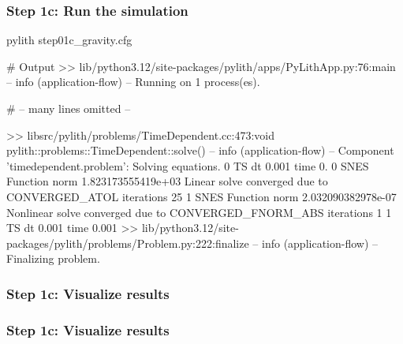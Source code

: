 \documentclass[aspectratio=169]{beamer}
\begin{document}
\begin{frame}[fragile]
  \frametitle{Step 1c: Run the simulation}
  \summary{}

\begin{pyrejournal}
pylith step01c_gravity.cfg

# Output
 >> lib/python3.12/site-packages/pylith/apps/PyLithApp.py:76:main
 -- info (application-flow)
 -- Running on 1 process(es).

# -- many lines omitted --

 >> libsrc/pylith/problems/TimeDependent.cc:473:void pylith::problems::TimeDependent::solve()
 -- info (application-flow)
 -- Component 'timedependent.problem': Solving equations.
0 TS dt 0.001 time 0.
    0 SNES Function norm 1.823173555419e+03
      Linear solve converged due to CONVERGED_ATOL iterations 25
    1 SNES Function norm 2.032090382978e-07
    Nonlinear solve converged due to CONVERGED_FNORM_ABS iterations 1
1 TS dt 0.001 time 0.001
 >> lib/python3.12/site-packages/pylith/problems/Problem.py:222:finalize
 -- info (application-flow)
 -- Finalizing problem.
\end{pyrejournal}
  
\end{frame}



\begin{frame}
  \frametitle{Step 1c: Visualize results}

    
\end{frame}


\begin{frame}
  \frametitle{Step 1c: Visualize results}

    
\end{frame}
\end{document}

